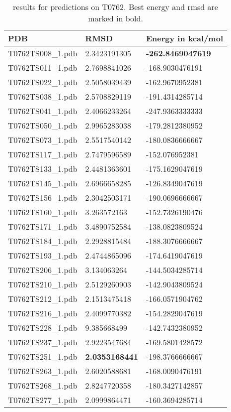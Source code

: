 \begin{table}
\caption{results for predictions on T0762. Best energy and rmsd are marked in bold.}
\begin{tabular}{lll}
PDB & RMSD & Energy in kcal/mol\\\hline
T0762TS008\_1.pdb & 2.3423191305 & \textbf{-262.8469047619}\\
T0762TS011\_1.pdb & 2.7698841026 & -168.9030476191\\
T0762TS022\_1.pdb & 2.5058039439 & -162.9670952381\\
T0762TS038\_1.pdb & 2.5708829119 & -191.4314285714\\
T0762TS041\_1.pdb & 2.4066233264 & -247.9363333333\\
T0762TS050\_1.pdb & 2.9965283038 & -179.2812380952\\
T0762TS073\_1.pdb & 2.5517540142 & -180.0836666667\\
T0762TS117\_1.pdb & 2.7479596589 & -152.076952381\\
T0762TS133\_1.pdb & 2.4481363601 & -175.1629047619\\
T0762TS145\_1.pdb & 2.6966658285 & -126.8349047619\\
T0762TS156\_1.pdb & 2.3042503171 & -190.0696666667\\
T0762TS160\_1.pdb & 3.263572163 & -152.7326190476\\
T0762TS171\_1.pdb & 3.4890752584 & -138.0823809524\\
T0762TS184\_1.pdb & 2.2928815484 & -188.3076666667\\
T0762TS193\_1.pdb & 2.4744865096 & -174.6419047619\\
T0762TS206\_1.pdb & 3.134063264 & -144.5034285714\\
T0762TS210\_1.pdb & 2.5129260903 & -142.9043809524\\
T0762TS212\_1.pdb & 2.1513475418 & -166.0571904762\\
T0762TS216\_1.pdb & 2.4099770382 & -154.2829047619\\
T0762TS228\_1.pdb & 9.385668499 & -142.7432380952\\
T0762TS237\_1.pdb & 2.9223547684 & -169.5801428572\\
T0762TS251\_1.pdb & \textbf{2.0353168441} & -198.3766666667\\
T0762TS263\_1.pdb & 2.6020588681 & -168.0090476191\\
T0762TS268\_1.pdb & 2.8247720358 & -180.3427142857\\
T0762TS277\_1.pdb & 2.0999864471 & -160.3694285714\\

\end{tabular}
\end{table}
